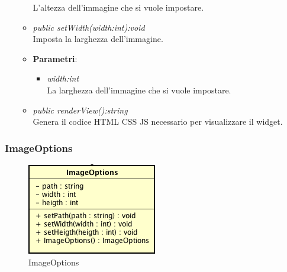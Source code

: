\begin{itemize}
\begin{itemize}
{\begin{itemize}
		L'altezza dell'immagine che si vuole impostare.
		\end{itemize}}
	\item \textit{public setWidth(width:int):void}\\
	Imposta la larghezza dell'immagine.
		\item{\textbf{Parametri}: \begin{itemize}
		\item \textit{width:int}\\
		La larghezza dell'immagine che si vuole impostare.
		\end{itemize}}
	\item \textit{public renderView():string}\\
	Genera il codice HTML CSS JS necessario per visualizzare il widget.
	\end{itemize}
\end{itemize}

\subsubsection{ImageOptions}

\label{ImageOptions}
\begin{figure}[ht]
	\centering
	\includegraphics[scale=0.5]{Sezioni/SottosezioniST/img/ImageOptions.png}
	\caption{ImageOptions}
\end{figure}

